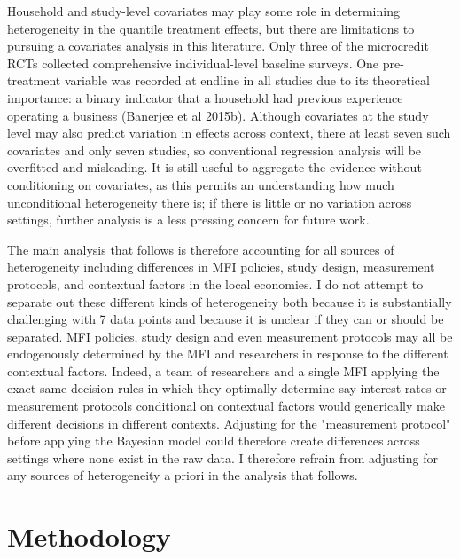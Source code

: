 \documentclass[english,12pt]{article}\usepackage{lmodern}
\numberwithin{equation}{section}
\begin{document}
Household and study-level covariates may play some role in determining heterogeneity in the quantile treatment effects, but there are limitations to pursuing a covariates analysis in this literature. Only three of the microcredit RCTs collected comprehensive individual-level baseline surveys. One pre-treatment variable was recorded at endline in all studies due to its theoretical importance: a binary indicator that a household had previous experience operating a business (Banerjee et al 2015b). Although covariates at the study level may also predict variation in effects across context, there at least seven such covariates and only seven studies, so conventional regression analysis will be overfitted and misleading. It is still useful to aggregate the evidence without conditioning on covariates, as this permits an understanding how much unconditional heterogeneity there is; if there is little or no variation across settings, further analysis is a less pressing concern for future work.

The main analysis that follows is therefore accounting for all sources of heterogeneity including differences in MFI policies, study design, measurement protocols, and contextual factors in the local economies. I do not attempt to separate out these different kinds of heterogeneity both because it is substantially challenging with 7 data points and because it is unclear if they can or should be separated. MFI policies, study design and even measurement protocols may all be endogenously determined by the MFI and researchers in response to the different contextual factors. Indeed, a team of researchers and a single MFI applying the exact same decision rules in which they optimally determine say interest rates or measurement protocols conditional on contextual factors would generically make different decisions in different contexts. Adjusting for the "measurement protocol" before applying the Bayesian model could therefore create differences across settings where none exist in the raw data. I therefore refrain from adjusting for any sources of heterogeneity a priori in the analysis that follows.

\section{Methodology}\label{methodology}
\end{document}
